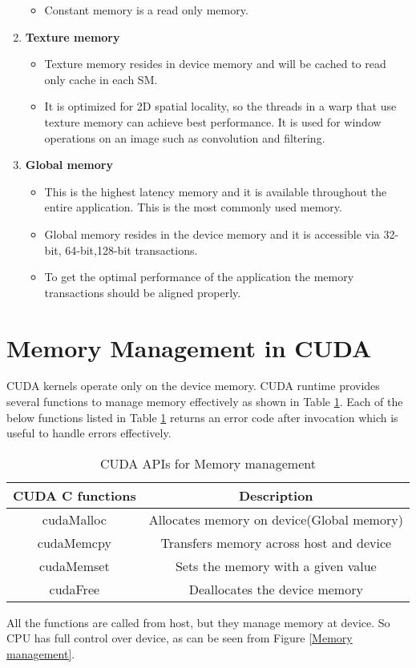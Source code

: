 \begin{enumerate}
\begin{itemize}
\item Constant memory is a read only memory.
\end{itemize}
\item \textbf{Texture memory}
\begin{itemize}
\item Texture memory resides in device memory and will be cached to read only cache in each SM.
\item It is optimized for 2D spatial locality, so the threads in a warp that use texture memory can achieve best performance. It is used for window operations on an image such as convolution and filtering.
\end{itemize}
\item \textbf{Global memory}
\begin{itemize}
\item This is the highest latency memory and it is available throughout the entire application. This is the most commonly used memory.
\item Global memory resides in the device memory and it is accessible via 32-bit, 64-bit,128-bit transactions.
\item To get the optimal performance of the application the memory transactions should be aligned properly.
\end{itemize}
\end{enumerate}
\section{Memory Management in CUDA}
CUDA kernels operate only on the device memory. CUDA runtime provides several functions to manage memory effectively as shown in Table  \ref{Memory management in CUDA}. Each of the below functions listed in Table \ref{Memory management in CUDA} returns an error code after invocation which is useful to handle errors effectively.
\begin{table}[h!]
\centering
\begin{tabular}{ |c|c| }
\hline
\textbf{CUDA C functions} & \textbf{Description} \\
\hline
cudaMalloc & Allocates memory on device(Global memory) \\  
\hline
cudaMemcpy & Transfers memory across host and device \\	
\hline
cudaMemset & Sets the memory with a given value \\
\hline
cudaFree & Deallocates the device memory \\
\hline
\end{tabular}
\caption{CUDA APIs for Memory management}
\label{Memory management in CUDA}
\end{table}
All the functions are called from host, but they manage memory at device. So CPU has full control over device, as can be seen from Figure \ref{Memory management}.

